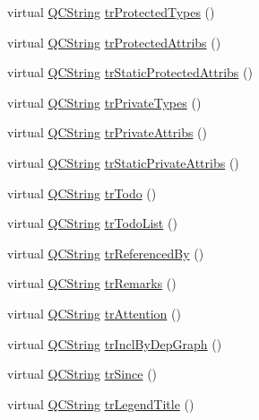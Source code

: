 \begin{DoxyCompactItemize}
\item 
virtual \hyperlink{class_q_c_string}{Q\+C\+String} \hyperlink{class_translator_norwegian_a73cfaf2445d38d8a795d33c88a53ab51}{tr\+Protected\+Types} ()
\item 
virtual \hyperlink{class_q_c_string}{Q\+C\+String} \hyperlink{class_translator_norwegian_a491fa9df8c137a91064f3accb1e00f83}{tr\+Protected\+Attribs} ()
\item 
virtual \hyperlink{class_q_c_string}{Q\+C\+String} \hyperlink{class_translator_norwegian_a0a592f2cdf10b373c09d9bb2ef3441f0}{tr\+Static\+Protected\+Attribs} ()
\item 
virtual \hyperlink{class_q_c_string}{Q\+C\+String} \hyperlink{class_translator_norwegian_a09482c516da8b4b1cb52f47d0268b037}{tr\+Private\+Types} ()
\item 
virtual \hyperlink{class_q_c_string}{Q\+C\+String} \hyperlink{class_translator_norwegian_a71fc167aa80051971bf4069546534019}{tr\+Private\+Attribs} ()
\item 
virtual \hyperlink{class_q_c_string}{Q\+C\+String} \hyperlink{class_translator_norwegian_af0cc84815b00ff1fdc06b11818200d6b}{tr\+Static\+Private\+Attribs} ()
\item 
virtual \hyperlink{class_q_c_string}{Q\+C\+String} \hyperlink{class_translator_norwegian_a8078fc6d735d389ae864ed6e9416803d}{tr\+Todo} ()
\item 
virtual \hyperlink{class_q_c_string}{Q\+C\+String} \hyperlink{class_translator_norwegian_a054e211de282ce9201cdceac355a0995}{tr\+Todo\+List} ()
\item 
virtual \hyperlink{class_q_c_string}{Q\+C\+String} \hyperlink{class_translator_norwegian_ae32356595a55c42b81b6d0a776bfeb18}{tr\+Referenced\+By} ()
\item 
virtual \hyperlink{class_q_c_string}{Q\+C\+String} \hyperlink{class_translator_norwegian_ad2e34e86d6d763c36b0d4dce48c2cbec}{tr\+Remarks} ()
\item 
virtual \hyperlink{class_q_c_string}{Q\+C\+String} \hyperlink{class_translator_norwegian_a1147bbd6f05464b938edd73a40bdd13b}{tr\+Attention} ()
\item 
virtual \hyperlink{class_q_c_string}{Q\+C\+String} \hyperlink{class_translator_norwegian_a9d6a4e85f910494d114f24b6a52f17a1}{tr\+Incl\+By\+Dep\+Graph} ()
\item 
virtual \hyperlink{class_q_c_string}{Q\+C\+String} \hyperlink{class_translator_norwegian_a56784b7ec750172349c5450b8798f4d5}{tr\+Since} ()
\item 
virtual \hyperlink{class_q_c_string}{Q\+C\+String} \hyperlink{class_translator_norwegian_ada178c4fca36d1dcd703f23e63c060f7}{tr\+Legend\+Title} ()

\end{DoxyCompactItemize}

